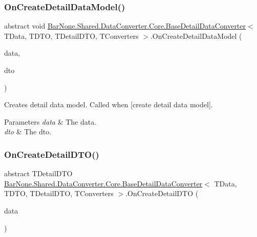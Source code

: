 \subsubsection{\texorpdfstring{On\+Create\+Detail\+Data\+Model()}{OnCreateDetailDataModel()}}
{\footnotesize\ttfamily abstract void \mbox{\hyperlink{class_bar_none_1_1_shared_1_1_data_converter_1_1_core_1_1_base_detail_data_converter}{Bar\+None.\+Shared.\+Data\+Converter.\+Core.\+Base\+Detail\+Data\+Converter}}$<$ T\+Data, T\+D\+TO, T\+Detail\+D\+TO, T\+Converters $>$.On\+Create\+Detail\+Data\+Model (\begin{DoxyParamCaption}\item[{T\+Data}]{data,  }\item[{T\+Detail\+D\+TO}]{dto }\end{DoxyParamCaption})\hspace{0.3cm}{\ttfamily [pure virtual]}}



Creates detail data model. Called when \mbox{[}create detail data model\mbox{]}. 


\begin{DoxyParams}{Parameters}
{\em data} & The data.\\
\hline
{\em dto} & The dto.\\
\hline
\end{DoxyParams}
\mbox{\label{class_bar_none_1_1_shared_1_1_data_converter_1_1_core_1_1_base_detail_data_converter_ae96fe016e35bfc9200cb344f4686ca0f}} 
\subsubsection{\texorpdfstring{On\+Create\+Detail\+D\+T\+O()}{OnCreateDetailDTO()}}
{\footnotesize\ttfamily abstract T\+Detail\+D\+TO \mbox{\hyperlink{class_bar_none_1_1_shared_1_1_data_converter_1_1_core_1_1_base_detail_data_converter}{Bar\+None.\+Shared.\+Data\+Converter.\+Core.\+Base\+Detail\+Data\+Converter}}$<$ T\+Data, T\+D\+TO, T\+Detail\+D\+TO, T\+Converters $>$.On\+Create\+Detail\+D\+TO (\begin{DoxyParamCaption}\item[{T\+Data}]{data }\end{DoxyParamCaption})\hspace{0.3cm}{\ttfamily [pure virtual]}}



